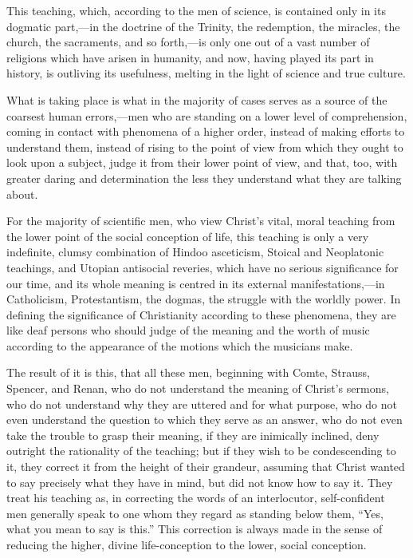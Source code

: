 \documentclass{book}
\begin{document}
This teaching, which, according to the men of science, is contained only in its dogmatic part,—in the doctrine of the Trinity, the redemption, the miracles, the church, the sacraments, and so forth,—is only one out of a vast number of religions which have arisen in humanity, and now, having played its part in history, is outliving its usefulness, melting in the light of science and true culture.

What is taking place is what in the majority of cases serves as a source of the coarsest human errors,—men who are standing on a lower level of comprehension, coming in contact with phenomena of a higher order, instead of making efforts to understand them, instead of rising to the point of view from which they ought to look upon a subject, judge it from their lower point of view, and that, too, with greater daring and determination the less they understand what they are talking about.

For the majority of scientific men, who view Christ’s vital, moral teaching from the lower point of the social conception of life, this teaching is only a very indefinite, clumsy combination of Hindoo asceticism, Stoical and Neoplatonic teachings, and Utopian antisocial reveries, which have no serious significance for our time, and its whole meaning is centred in its external manifestations,—in Catholicism, Protestantism, the dogmas, the struggle with the worldly power. In defining the significance of Christianity according to these phenomena, they are like deaf persons who should judge of the meaning and the worth of music according to the appearance of the motions which the musicians make.

The result of it is this, that all these men, beginning with Comte, Strauss, Spencer, and Renan, who do not understand the meaning of Christ’s sermons, who do not understand why they are uttered and for what purpose, who do not even understand the question to which they serve as an answer, who do not even take the trouble to grasp their meaning, if they are inimically inclined, deny outright the rationality of the teaching; but if they wish to be condescending to it, they correct it from the height of their grandeur, assuming that Christ wanted to say precisely what they have in mind, but did not know how to say it. They treat his teaching as, in correcting the words of an interlocutor, self-confident men generally speak to one whom they regard as standing below them, “Yes, what you mean to say is this.” This correction is always made in the sense of reducing the higher, divine life-conception to the lower, social conception.
\end{document}
